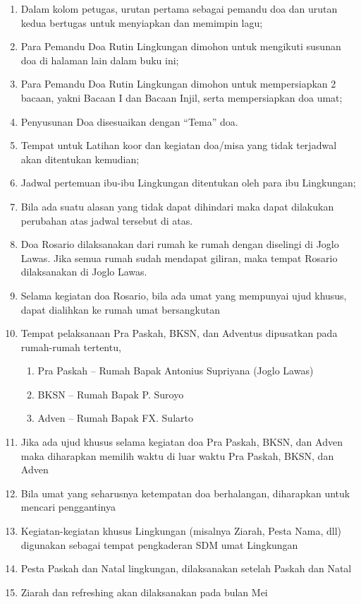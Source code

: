 \begin{enumerate}
\item Dalam kolom petugas, urutan pertama sebagai pemandu doa dan urutan
kedua bertugas untuk menyiapkan dan memimpin lagu;
\item Para Pemandu Doa Rutin Lingkungan dimohon untuk mengikuti susunan
doa di halaman lain dalam buku ini;
\item Para Pemandu Doa Rutin Lingkungan dimohon untuk mempersiapkan 2
bacaan, yakni Bacaan I dan Bacaan Injil, serta mempersiapkan doa umat;
\item Penyusunan Doa disesuaikan dengan
{\textquotedblleft}Tema{\textquotedblright} doa. 
\item Tempat untuk Latihan koor dan kegiatan doa/misa yang tidak
terjadwal akan ditentukan kemudian;
\item Jadwal pertemuan ibu-ibu Lingkungan ditentukan oleh para ibu
Lingkungan;
\item Bila ada suatu alasan yang tidak dapat dihindari maka dapat
dilakukan perubahan atas jadwal tersebut di atas. 
\item Doa Rosario dilaksanakan dari rumah ke rumah dengan diselingi di Joglo Lawas. Jika semua rumah sudah mendapat giliran, maka tempat Rosario dilaksanakan di Joglo Lawas.
\item Selama kegiatan doa Rosario, bila ada umat yang mempunyai ujud khusus, dapat dialihkan ke rumah umat bersangkutan
\item Tempat pelaksanaan Pra Paskah, BKSN, dan Adventus dipusatkan pada rumah-rumah tertentu,
\begin{enumerate}
\item Pra Paskah -- Rumah Bapak Antonius Supriyana (Joglo Lawas)
\item BKSN -- Rumah Bapak P. Suroyo
\item Adven -- Rumah Bapak FX. Sularto
\end{enumerate}

\item Jika ada ujud khusus selama kegiatan doa Pra Paskah, BKSN, dan Adven maka diharapkan memilih waktu di luar waktu Pra Paskah, BKSN, dan Adven
\item Bila umat yang seharusnya ketempatan doa berhalangan, diharapkan untuk
mencari penggantinya
\item Kegiatan-kegiatan khusus Lingkungan (misalnya Ziarah, Pesta Nama, dll) digunakan sebagai tempat pengkaderan SDM umat Lingkungan 
\item Pesta Paskah dan Natal lingkungan, dilaksanakan setelah Paskah dan Natal
\item Ziarah dan refreshing akan dilaksanakan pada bulan Mei
\end{enumerate}
